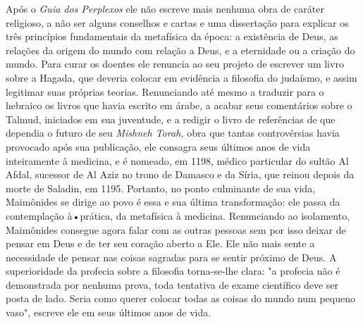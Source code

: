 Após o \emph{Guia dos Perplexos} ele não escreve mais nenhuma obra de
caráter religioso, a não ser alguns conselhos e cartas e uma dissertação
para ex­plicar os três princípios fundamentais da metafísica da época: a
existência de Deus, as relações da origem do mundo com relação a Deus, e
a eternidade ou a criação do mundo. Para curar os doentes ele renuncia
ao seu projeto de es­crever um livro sobre a Hagada, que deveria colocar
em evidência a filosofia do judaísmo, e assim legitimar suas próprias
teorias. Renunciando até mesmo a traduzir para o hebraico os livros que
havia escrito em árabe, a acabar seus comentários sobre o Talmud,
iniciados em sua juventude, e a redigir o livro de referências de que
dependia o futuro de seu \emph{Mishneh Torah,} obra que tan­tas
controvérsias havia provocado após sua publicação, ele consagra seus
últi­mos anos de vida inteiramente à medicina, e é nomeado, em 1198,
médico par­ticular do sultão Al Afdal, sucessor de Al Aziz no trono de
Damasco e da Síria, que reinou depois da morte de Saladin, em 1195.
Portanto, no ponto culmi­nante de sua vida, Maimônides se dirige ao povo
é essa e sua última transforma­ção: ele passa da contemplação à•prática,
da metafísica à medicina. Renuncian­do ao isolamento, Maimônides
consegue agora falar com as outras pessoas sem por isso deixar de pensar
em Deus e de ter seu coração aberto a Ele. Ele não mais sente a
necessidade de pensar nas coisas sagradas para se sentir próximo de
Deus. A superioridade da profecia sobre a filosofia torna-se-lhe clara:
"a pro­fecia não é demonstrada por nenhuma prova, toda tentativa de
exame científi­co deve ser posta de lado. Seria como querer colocar
todas as coisas do mundo num pequeno vaso", escreve ele em seus últimos
anos de vida.

